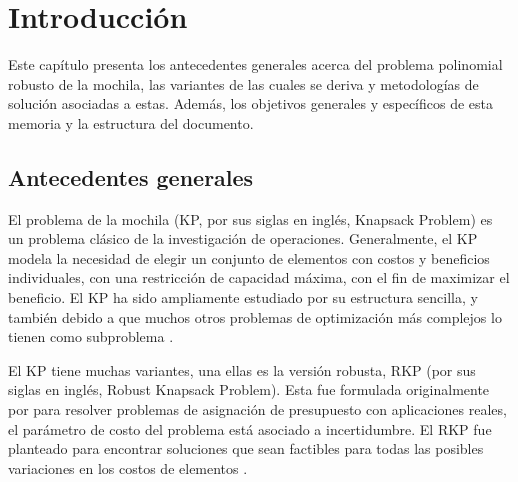 \documentclass[spanish, a4paper, 12pt, openany,final]{book}
\begin{document}
\newpage
{}   %
\setcounter{page}{1}                                    %


\chapter{Introducción}
Este capítulo presenta los antecedentes generales acerca del problema polinomial robusto de la mochila, las variantes de las cuales se deriva y metodologías de solución asociadas a estas. Además, los objetivos generales y específicos de esta memoria y la estructura del documento.


\section{Antecedentes generales}

El problema de la mochila (KP, por sus siglas en inglés, Knapsack Problem) es un problema clásico de la investigación de operaciones. Generalmente, el KP modela la necesidad de elegir un conjunto de elementos con costos y beneficios individuales, con una restricción de capacidad máxima, con el fin de maximizar el beneficio. El KP ha sido ampliamente estudiado por su estructura sencilla, y también debido a que muchos otros problemas de optimización más complejos lo tienen como subproblema \citep*{martello_knapsack_1990}.

El KP tiene muchas  variantes, una ellas es la versión robusta, RKP (por sus siglas en inglés, Robust Knapsack Problem). Esta fue formulada originalmente por \cite{eilon_application_1987} para resolver problemas de asignación de presupuesto con aplicaciones reales, el parámetro de costo del problema está asociado a incertidumbre. El RKP fue planteado para encontrar soluciones que sean factibles para todas las posibles variaciones en los costos de elementos \citep{monaci_exact_2013}.
\end{document}
